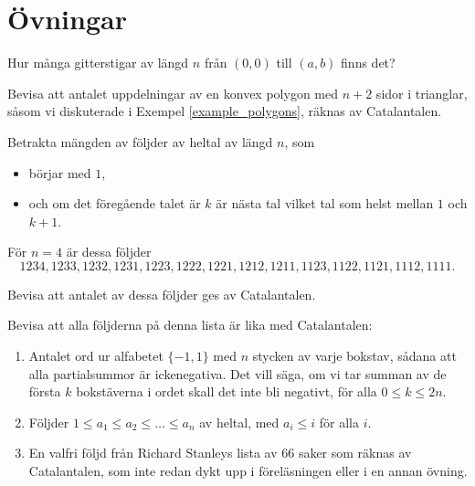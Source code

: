\documentclass{tufte-handout}
\begin{document}
\section{Övningar}

\begin{xca}
    Hur många gitterstigar av längd $n$ från $(0,0)$ till $(a,b)$ finns det?
\end{xca}

\begin{xca}
    Bevisa att antalet uppdelningar av en konvex polygon med $n+2$ sidor i trianglar, såsom vi diskuterade i Exempel \ref{example_polygons}, räknas av Catalantalen.
\end{xca}

\begin{xca}
    Betrakta mängden av följder av heltal av längd $n$, som
    \begin{itemize}
        \item börjar med $1$,
        \item och om det föregående talet är $k$ är nästa tal vilket tal som helst mellan $1$ och $k+1$.
    \end{itemize} 

    För $n = 4$ är dessa följder
    $$1234, 1233, 1232, 1231, 1223, 1222, 1221, 1212, 1211, 1123, 1122, 1121, 1112, 1111.$$

    Bevisa att antalet av dessa följder ges av Catalantalen.
\end{xca}

\begin{xca}
    Bevisa att alla följderna på denna lista är lika med Catalantalen:
    \begin{enumerate}
        \item Antalet ord ur alfabetet $\{-1, 1\}$ med $n$ stycken av varje bokstav, sådana att alla partialsummor är ickenegativa. Det vill säga, om vi tar summan av de första $k$ bokstäverna i ordet skall det inte bli negativt, för alla $0 \leq k \leq 2n$.
        \item Följder $1 \leq a_1 \leq a_2 \leq \ldots \leq a_n$ av heltal, med $a_i \leq i$ för alla $i$.
        \item En valfri följd från Richard Stanleys lista av 66 saker som räknas av Catalantalen, som inte redan dykt upp i föreläsningen eller i en annan övning.
    \end{enumerate}
\end{xca}
\end{document}
